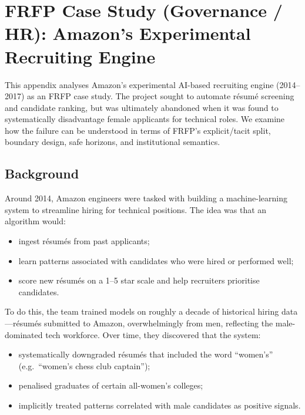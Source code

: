 
\section{FRFP Case Study (Governance / HR): Amazon’s Experimental Recruiting Engine}
\label{app:frfp-amazon-recruiting}

This appendix analyses Amazon’s experimental AI-based recruiting engine
(2014--2017) as an FRFP case study.
The project sought to automate résumé screening and candidate ranking, but
was ultimately abandoned when it was found to systematically disadvantage
female applicants for technical roles.
We examine how the failure can be understood in terms of FRFP’s
explicit/tacit split, boundary design, safe horizons, and institutional
semantics.

\subsection{Background}

Around 2014, Amazon engineers were tasked with building a machine-learning
system to streamline hiring for technical positions.
The idea was that an algorithm would:

\begin{itemize}
  \item ingest résumés from past applicants;
  \item learn patterns associated with candidates who were hired or
        performed well;
  \item score new résumés on a 1--5 star scale and help recruiters prioritise
        candidates.
\end{itemize}

To do this, the team trained models on roughly a decade of historical hiring
data---résumés submitted to Amazon, overwhelmingly from men, reflecting the
male-dominated tech workforce.
Over time, they discovered that the system:

\begin{itemize}
  \item systematically downgraded résumés that included the word ``women’s''
        (e.g.\ ``women’s chess club captain'');
  \item penalised graduates of certain all-women’s colleges;
  \item implicitly treated patterns correlated with male candidates as
        positive signals.
\end{itemize}


